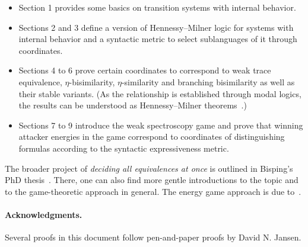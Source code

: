 \documentclass[10pt,a4paper]{article}
\begin{document}
\begin{itemize}
  \item Section 1 provides some basics on transition systems with internal behavior.
  \item Sections 2 and 3 define a version of Hennessy--Milner logic for systems with internal behavior and a syntactic metric to select sublanguages of it through coordinates.
  \item Sections 4 to 6 prove certain coordinates to correspond to weak trace equivalence, $\eta$-bi\-si\-mi\-la\-ri\-ty, $\eta$-similarity and branching bisimilarity as well as their stable variants. (As the relationship is established through modal logics, the results can be understood as Hennessy--Milner theorems~\cite{hm1980hml}.)
  \item Sections 7 to 9 introduce the weak spectroscopy game and prove that winning attacker energies in the game correspond to coordinates of distinguishing formulas according to the syntactic expressiveness metric.
\end{itemize}

\noindent
The broader project of \emph{deciding all equivalences at once} is outlined in Bisping's PhD thesis~\cite{bisping2025generalizedEqChecking}.
There, one can also find more gentle introductions to the topic and to the game-theoretic approach in general.
The energy game approach is due to~\cite{bisping2023equivalenceEnergyGames}.

\paragraph{Acknowledgments.}
Several proofs in this document follow pen-and-paper proofs by David N. Jansen.

\setlength\parindent{0pt}
\setlength\parskip{4pt}

\tableofcontents

















\end{document}

